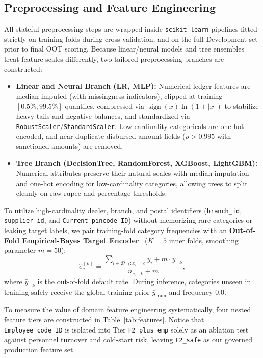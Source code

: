 \subsection{Preprocessing and Feature Engineering}
All stateful preprocessing steps are wrapped inside \texttt{scikit-learn} pipelines fitted strictly on training folds during cross-validation, and on the full Development set prior to final OOT scoring. Because linear/neural models and tree ensembles treat feature scales differently, two tailored preprocessing branches are constructed:
\begin{itemize}
  \item \textbf{Linear and Neural Branch (LR, MLP):} Numerical ledger features are median-imputed (with missingness indicators), clipped at training $[0.5\%, 99.5\%]$ quantiles, compressed via $\operatorname{sign}(x)\ln(1+|x|)$ to stabilize heavy tails and negative balances, and standardized via \texttt{RobustScaler}/\texttt{StandardScaler}. Low-cardinality categoricals are one-hot encoded, and near-duplicate disbursed-amount fields ($\rho > 0.995$ with sanctioned amounts) are removed.
  \item \textbf{Tree Branch (DecisionTree, RandomForest, XGBoost, LightGBM):} Numerical attributes preserve their natural scales with median imputation and one-hot encoding for low-cardinality categories, allowing trees to split cleanly on raw rupee and percentage thresholds.
\end{itemize}

To utilize high-cardinality dealer, branch, and postal identifiers (\texttt{branch\_id}, \texttt{supplier\_id}, and \texttt{Current\_pincode\_ID}) without memorizing rare categories or leaking target labels, we pair training-fold category frequencies with an \textbf{Out-of-Fold Empirical-Bayes Target Encoder}~\cite{miccibarreca2001} ($K=5$ inner folds, smoothing parameter $m=50$):
\begin{equation}
\label{eq:oof_te}
  \hat{e}_{c}^{(k)} = \frac{\sum_{i \in \mathcal{D}_{-k} : x_i = c} y_i + m \cdot \bar{y}_{-k}}{n_{c,-k} + m},
\end{equation}
where $\bar{y}_{-k}$ is the out-of-fold default rate. During inference, categories unseen in training safely receive the global training prior $\bar{y}_{\text{train}}$ and frequency $0.0$.

To measure the value of domain feature engineering systematically, four nested feature tiers are constructed in Table~\ref{tab:features}. Notice that \texttt{Employee\_code\_ID} is isolated into Tier \texttt{F2\_plus\_emp} solely as an ablation test against personnel turnover and cold-start risk, leaving \texttt{F2\_safe} as our governed production feature set.

